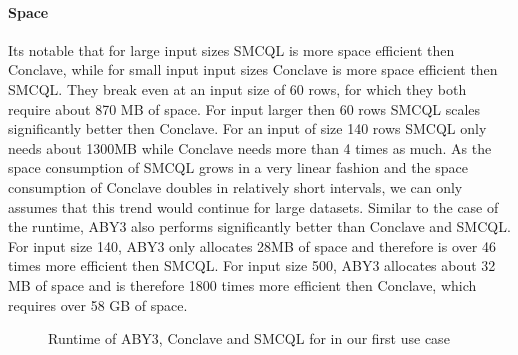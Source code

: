 \paragraph{Space}
Its notable that for large input sizes SMCQL is more space efficient then Conclave, while for small input input sizes Conclave is more space efficient then SMCQL. They break even at an input size of 60 rows, for which they both require about 870 MB of space. For input larger then 60 rows SMCQL scales significantly better then Conclave. For an input of size 140 rows SMCQL only needs about 1300MB while Conclave needs more than 4 times as much. As the space consumption of SMCQL grows in a very linear fashion and the space consumption of Conclave doubles in relatively short intervals, we can only assumes that this trend would continue for large datasets. Similar to the case of the runtime, ABY3 also performs significantly better than Conclave and SMCQL. For input size 140, ABY3 only allocates 28MB of space and therefore is over 46 times more efficient then SMCQL. For input size 500, ABY3 allocates about 32 MB of space and is therefore 1800 times more efficient then Conclave, which requires over 58 GB of space.          
 
\label{evaluation}
\begin{figure}
	\caption{Runtime of ABY3, Conclave and SMCQL for in our first use case}
\end{figure}


